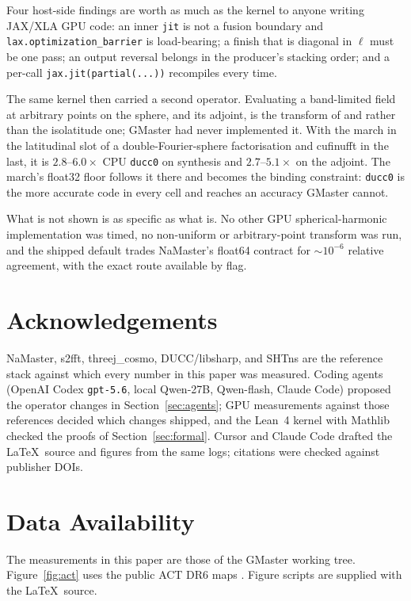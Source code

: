 \documentclass[usenatbib,useAMS]{mnras}
\begin{document}
Four host-side findings are worth as much as the kernel to anyone writing JAX/XLA GPU code: an inner \texttt{jit} is not a fusion boundary and \texttt{lax.optimization\_barrier} is load-bearing; a finish that is diagonal in $\ell$ must be one pass; an output reversal belongs in the producer's stacking order; and a per-call \texttt{jax.jit(partial(...))} recompiles every time.

The same kernel then carried a second operator. Evaluating a band-limited field at arbitrary points on the sphere, and its adjoint, is the transform of \citet{reinecke2023} and \citet{belkner2024} rather than the isolatitude one; GMaster had never implemented it. With the march in the latitudinal slot of a double-Fourier-sphere factorisation and cufinufft in the last, it is $2.8$--$6.0\times$ CPU \texttt{ducc0} on synthesis and $2.7$--$5.1\times$ on the adjoint. The march's float32 floor follows it there and becomes the binding constraint: \texttt{ducc0} is the more accurate code in every cell and reaches an accuracy GMaster cannot.

What is not shown is as specific as what is. No other GPU spherical-harmonic implementation was timed, no non-uniform or arbitrary-point transform was run, and the shipped default trades NaMaster's float64 contract for $\sim10^{-6}$ relative agreement, with the exact route available by flag.

\section*{Acknowledgements}

NaMaster, s2fft, threej\_cosmo, DUCC/libsharp, and SHTns are the reference stack against which every number in this paper was measured. Coding agents (OpenAI Codex \texttt{gpt-5.6}, local Qwen-27B, Qwen-flash, Claude Code) proposed the operator changes in Section~\ref{sec:agents}; GPU measurements against those references decided which changes shipped, and the Lean~4 kernel with Mathlib checked the proofs of Section~\ref{sec:formal}. Cursor and Claude Code drafted the \LaTeX\ source and figures from the same logs; citations were checked against publisher DOIs.

\section*{Data Availability}

The measurements in this paper are those of the GMaster working tree. Figure~\ref{fig:act} uses the public ACT DR6 maps \citep{naess2025}. Figure scripts are supplied with the \LaTeX\ source.
\end{document}
